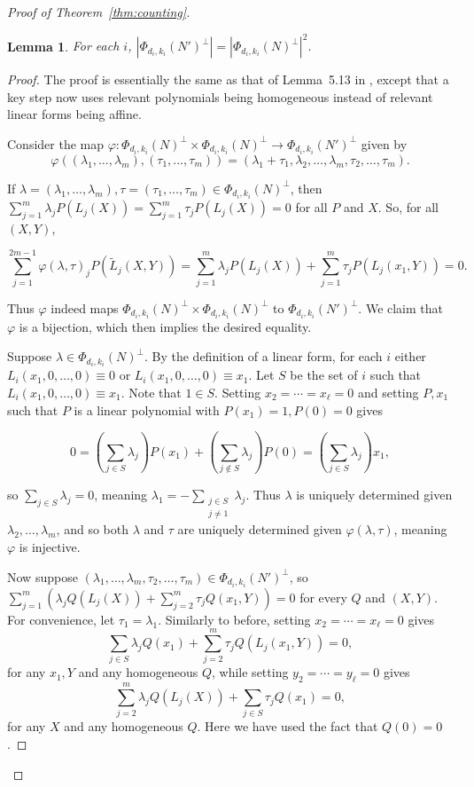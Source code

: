 \documentclass{article}
\theoremstyle{plain}
\newtheorem{lem}[theorem]{Lemma}
\theoremstyle{definition}
\theoremstyle{definition}
\theoremstyle{remark}
\numberwithin{equation}{section}
\begin{document}
\begin{proof}[Proof of Theorem~\ref{thm:counting}]
\begin{lem}
\label{lem:equivConsistent}
For each $i$, $|\Phi_{d_i,k_i}(N')^\perp|=|\Phi_{d_i,k_i}(N)^\perp|^2$.
\end{lem}
\begin{proof}
The proof is essentially the same as that of Lemma~5.13 in \cite{VeryCountingMaybe}, except that a key step now uses relevant polynomials being homogeneous instead of relevant linear forms being affine.

Consider the map $\varphi: \Phi_{d_i,k_i}(N)^\perp \times \Phi_{d_i,k_i}(N)^\perp \to \Phi_{d_i,k_i}(N')^\perp$ given by
\[\varphi((\lambda_1,\dots,\lambda_m),(\tau_1,\dots,\tau_m))=(\lambda_1 + \tau_1 ,\lambda_2,\dots,\lambda_m, \tau_2,\dots,\tau_m).\]

If $\lambda=(\lambda_1,\dots,\lambda_m),\tau=(\tau_1,\dots,\tau_m)\in \Phi_{d_i,k_i}(N)^\perp$, then $\sum_{j=1}^m \lambda_j P(L_j(X)) = \sum_{j=1}^m \tau_j P(L_j(X)) = 0$ for all $P$ and $X$.  So, for all $(X,Y)$,

\[\sum_{j=1}^{2m-1} \varphi(\lambda,\tau)_j P(\tilde{L}_j(X,Y))=\sum_{j=1}^m \lambda_j P(L_j(X)) + \sum_{j=1}^m \tau_j P(L_j(x_1,Y)) = 0.\]

Thus $\varphi$ indeed maps $\Phi_{d_i,k_i}(N)^\perp \times \Phi_{d_i,k_i}(N)^\perp$ to $\Phi_{d_i,k_i}(N')^\perp$. We claim that $\varphi$ is a bijection, which then implies the desired equality.

Suppose $\lambda\in \Phi_{d_i,k_i}(N)^\perp$. By the definition of a linear form, for each $i$ either $L_i(x_1,0,\dots,0)\equiv 0$ or $L_i(x_1,0,\dots,0)\equiv x_1$. Let $S$ be the set of $i$ such that $L_i(x_1,0,\dots,0)\equiv x_1$. Note that $1\in S$. Setting $x_2=\cdots=x_\ell=0$ and setting $P,x_1$ such that $P$ is a linear polynomial with $P(x_1)=1,P(0)=0$ gives

\[0=\left(\sum_{j\in S} \lambda_j\right) P(x_1) + \left(\sum_{j\notin S} \lambda_j\right) P(0)=\left(\sum_{j\in S} \lambda_j\right) x_1,\]

so $\sum_{j\in S} \lambda_j = 0$, meaning $\lambda_1=-\sum_{\substack{j\in S \\ j\neq 1}} \lambda_j$. Thus $\lambda$ is uniquely determined given $\lambda_2,\dots,\lambda_m$, and so both $\lambda$ and $\tau$ are uniquely determined given $\varphi(\lambda,\tau)$, meaning $\varphi$ is injective.

Now suppose $(\lambda_1,\dots,\lambda_m,\tau_2,\dots,\tau_m)\in \Phi_{d_i,k_i}(N')^\perp$, so $\sum_{j=1}^m (\lambda_j Q(L_j(X))+\sum_{j=2}^m \tau_j Q(x_1,Y))=0$ for every $Q$ and $(X,Y)$. For convenience, let $\tau_1=\lambda_1$. Similarly to before, setting $x_2=\cdots=x_\ell=0$ gives
\[\sum_{j\in S} \lambda_j Q(x_1)+\sum_{j=2}^m \tau_j Q(L_j(x_1,Y))=0,\]
for any $x_1,Y$ and any homogeneous $Q$, while setting $y_2=\cdots=y_\ell=0$ gives
\[\sum_{j=2}^m \lambda_j Q(L_j(X))+\sum_{j\in S} \tau_j Q(x_1)=0,\]
for any $X$ and any homogeneous $Q$. Here we have used the fact that $Q(0)=0$.


\end{proof}
\end{proof}
\end{document}
